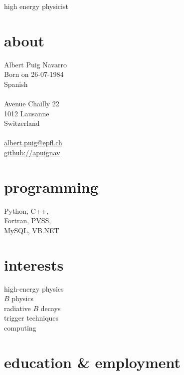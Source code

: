 
\usepackage{xspace}
\def\epfl{\'{E}cole Polytechnique F\'{e}d\'{e}rale de Lausanne\xspace}
\def\myast{\text{\,*}}


       {high energy physicist}

\begin{aside}
  \section{about}
    Albert Puig Navarro\\
    Born on 26-07-1984\\
    Spanish\\
    ~\\
    Avenue Chailly 22\\
    1012 Lausanne\\
    Switzerland\\
    ~\\
    \href{mailto:albert.puig@epfl.ch}{albert.puig@epfl.ch}\\
    \href{https://github.com/apuignav}{github://apuignav}\\
{  \section{programming}
    Python, C++,\\
    Fortran, PVSS,\\
    MySQL, VB.NET\\
}{}
    \section{interests}
    high-energy physics\\
    $B$ physics\\
    radiative $B$ decays\\
    trigger techniques\\
    computing\\
\end{aside}

\section{education \& employment}

